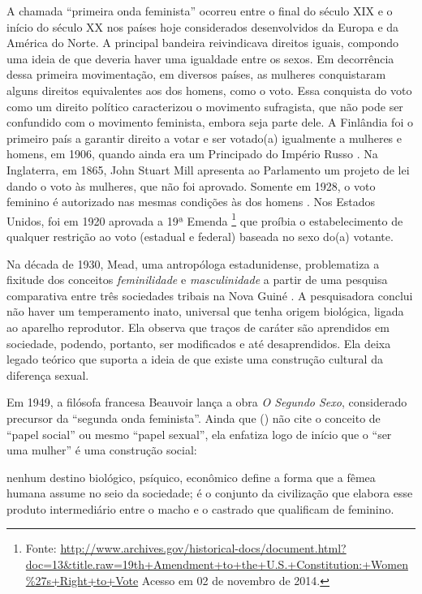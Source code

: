 A chamada ``primeira onda feminista'' ocorreu entre o final do século XIX e o início do século XX nos países hoje considerados desenvolvidos da Europa e da América do Norte. A principal bandeira reivindicava direitos iguais, compondo uma ideia de que deveria haver uma igualdade entre os sexos. Em decorrência dessa primeira movimentação, em diversos países, as mulheres conquistaram alguns direitos equivalentes aos dos homens, como o voto. Essa conquista do voto como um direito político caracterizou o movimento sufragista, que não pode ser confundido com o movimento feminista, embora seja parte dele.
A Finlândia foi o primeiro país a garantir direito a votar e ser votado(a) igualmente a mulheres e homens, em 1906, quando ainda era um Principado do Império Russo \cite{RAY1918}.
Na Inglaterra, em 1865, John Stuart Mill apresenta ao Parlamento um projeto de lei dando o voto às mulheres, que não foi aprovado. Somente em 1928, o voto feminino é autorizado nas mesmas condições às dos homens \cite{NELSON2004}.
Nos Estados Unidos, foi em 1920 aprovada a 19ª Emenda
\footnote{Fonte: \url{http://www.archives.gov/historical-docs/document.html?doc=13&title.raw=19th+Amendment+to+the+U.S.+Constitution:+Women\%27s+Right+to+Vote} Acesso em 02 de novembro de 2014.} que proíbia o estabelecimento de qualquer restrição ao voto (estadual e federal) baseada no sexo do(a) votante. 
 
Na década de 1930, Mead, uma antropóloga estadunidense, problematiza a fixitude dos conceitos \emph{feminilidade} e \emph{masculinidade} a partir de uma pesquisa comparativa entre três sociedades tribais na Nova Guiné  \cite{MEAD2000}. A pesquisadora conclui não haver um temperamento inato, universal que tenha origem biológica, ligada ao aparelho reprodutor. Ela observa que traços de caráter são aprendidos em sociedade, podendo, portanto, ser modificados e até desaprendidos. Ela deixa legado teórico que suporta a ideia de que existe uma construção cultural da diferença sexual.

Em 1949, a filósofa francesa Beauvoir lança a obra \emph{O Segundo Sexo}, considerado precursor da ``segunda onda feminista''\cite{PISCITELLI2009}. Ainda que  (\citeyear{BEAUVOIR1967}) não cite o conceito de  ``papel social'' ou mesmo ``papel sexual'', ela enfatiza logo de início que o ``ser uma mulher'' é uma construção social:

\begin{citacao}
nenhum destino biológico, psíquico, econômico define a forma que a fêmea humana assume no seio da sociedade; é o conjunto da civilização que elabora esse produto intermediário entre o macho e o castrado que qualificam de feminino.
\cite[p.09]{BEAUVOIR1967}
\end{citacao}

